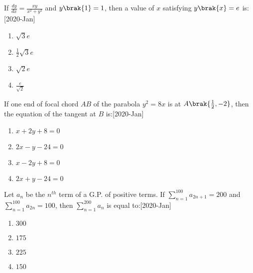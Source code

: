 \iffalse
    \title{2020}
    \author{EE24BTECH11011}
    \section{mcq-single}
\fi 
 
    \item If $\frac{dy}{dx} = \frac{xy}{x^2+y^2}$ and $y\brak{1}=1$, then a value of $x$ satisfying $y\brak{x}=e$ is: \hfill[2020-Jan]
    \begin{multicols}{2} %
    \begin{enumerate}
        \item $\sqrt{3} e$\\
        \item $\frac{1}{2} \sqrt{3} e$\\
        \item $\sqrt{2}e$\\
        \item $\frac{e}{\sqrt{2}}$
    \end{enumerate}
    \end{multicols}

    \item If one end of focal chord $AB$ of the parabola $y^2 = 8x$ is at $A\brak{\frac{1}{2},-2}$, then the equation of the tangent at $B$ is:\hfill[2020-Jan]
    \begin{multicols}{2}
    \begin{enumerate}
        \item $x+2y+8=0$
        \item $2x-y-24=0$
        \item $x-2y+8=0$
        \item $2x+y-24=0$
    \end{enumerate}
    \end{multicols}
  \item Let $a_n$ be the $n^{th}$ term of a G.P. of positive terms. If $\sum_{n=1}^{100} a_{2n+1} = 200$ and $\sum_{n=1}^{100}a_{2n} = 100$, then $\sum_{n=1}^{200}a_n$ is equal to:\hfill[2020-Jan]
    \begin{multicols}{2}
    \begin{enumerate}
        \item $300$\\
        \item $175$
        \item $225$\\
        \item $150$
    \end{enumerate}
    \end{multicols}

